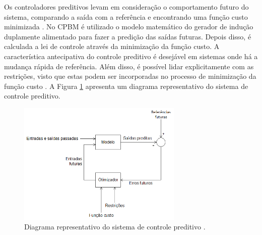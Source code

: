 	Os controladores preditivos levam em consideração o comportamento futuro do sistema, comparando a saída com a referência e encontrando uma função custo minimizada \cite{camachoteoriapreditivomodelo,rositierteoriapreditivomodelo,wangpreditivo}. No CPBM é utilizado o modelo matemático do gerador de indução duplamente alimentado para fazer a predição das saídas futuras. Depois disso, é calculada a lei de controle através da minimização da função custo. A característica antecipativa do controle preditivo é desejável em sistemas onde há a mudança rápida de referência. Além disso, é possível lidar explicitamente com as restrições, visto que estas podem ser incorporadas no processo de minimização da função custo \cite{alfeu}. A Figura \ref{figura:preditivo_esquema} apresenta um diagrama representativo do sistema de controle preditivo.
	\begin{figure}[h]
		\centering
		\includegraphics[width=0.7\textwidth]{Figuras/preditivo_esquematico.png}
		\caption{Diagrama representativo do sistema de controle preditivo \cite{alfeu}.}
		\label{figura:preditivo_esquema}
	\end{figure}

